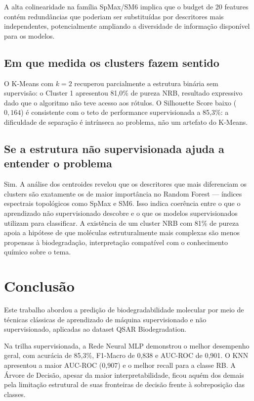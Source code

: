 \documentclass[12pt, a4paper]{article}
\begin{document}
A alta colinearidade na família SpMax/SM6 implica que o budget de 20 features
contém redundâncias que poderiam ser substituídas por descritores mais
independentes, potencialmente ampliando a diversidade de informação disponível
para os modelos.

\subsection{Em que medida os clusters fazem sentido}

O K-Means com $k=2$ recuperou parcialmente a estrutura binária sem supervisão:
o Cluster 1 apresentou 81,0\% de pureza NRB, resultado expressivo dado que o
algoritmo não teve acesso aos rótulos. O Silhouette Score baixo ($0{,}164$)
é consistente com o teto de performance supervisionada a 85,3\%: a dificuldade
de separação é intrínseca ao problema, não um artefato do K-Means.

\subsection{Se a estrutura não supervisionada ajuda a entender o problema}

Sim. A análise dos centroides revelou que os descritores que mais diferenciam
os clusters são exatamente os de maior importância no Random Forest --- índices
espectrais topológicos como SpMax e SM6. Isso indica coerência entre o que o
aprendizado não supervisionado descobre e o que os modelos supervisionados
utilizam para classificar. A existência de um cluster NRB com 81\% de pureza
apoia a hipótese de que moléculas estruturalmente mais complexas são menos
propensas à biodegradação, interpretação compatível com o conhecimento
químico sobre o tema.

\section{Conclusão}

Este trabalho abordou a predição de biodegradabilidade molecular por meio de
técnicas clássicas de aprendizado de máquina supervisionado e não supervisionado,
aplicadas ao dataset QSAR Biodegradation.

Na trilha supervisionada, a Rede Neural MLP demonstrou o melhor desempenho
geral, com acurácia de 85,3\%, F1-Macro de 0,838 e AUC-ROC de 0,901. O KNN
apresentou a maior AUC-ROC (0,907) e o melhor recall para a classe RB. A
Árvore de Decisão, apesar da maior interpretabilidade, ficou aquém dos demais
pela limitação estrutural de suas fronteiras de decisão frente à sobreposição
das classes.
\end{document}

